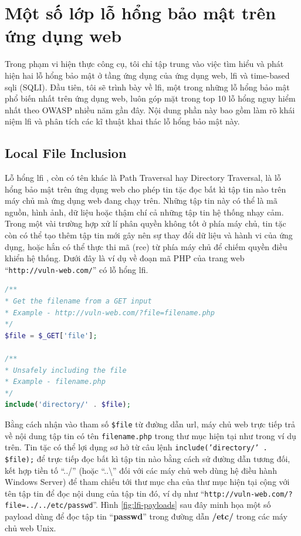 \chapter{Một số lớp lỗ hổng bảo mật trên ứng dụng web}
Trong phạm vi hiện thực công cụ, tôi chỉ tập trung vào việc tìm hiểu và phát hiện hai lỗ hổng bảo mật ở tầng ứng dụng của ứng dụng web, \acrfull{lfi} và time-based \acrlong{sqli} (SQLI). Đầu tiên, tôi sẽ trình bày về \acrfull{lfi}, một trong những lỗ hổng bảo mật phổ biến nhất trên ứng dụng web, luôn góp mặt trong top 10 lỗ hổng nguy hiểm nhất theo OWASP \parencite{owasp-top-10} nhiều năm gần đây. Nội dung phần này bao gồm làm rõ khái niệm \acrshort{lfi} và phân tích các kĩ thuật khai thác lỗ hổng bảo mật này.
\section{Local File Inclusion}
Lỗ hổng \acrfull{lfi} \parencite{portswigger-directory-traversal, owasp-path-traversal, sullivan2011web}, còn có tên khác là Path Traversal hay Directory Traversal, là lỗ hổng bảo mật trên ứng dụng web cho phép tin tặc đọc bất kì tập tin nào trên máy chủ mà ứng dụng web đang chạy trên. Những tập tin này có thể là mã nguồn, hình ảnh, dữ liệu hoặc thậm chí cả những tập tin hệ thống nhạy cảm. Trong một vài trường hợp xử lí phân quyền không tốt ở phía máy chủ, tin tặc còn có thể tạo thêm tập tin mới gây nên sự thay đổi dữ liệu và hành vi của ứng dụng, hoặc hắn có thể thực thi mã (\acrshort{rce}) từ phía máy chủ để chiếm quyền điều khiển hệ thống. Dưới đây là ví dụ về đoạn mã PHP của trang web ``\texttt{http://vuln-web.com/}'' có lỗ hổng \acrshort{lfi}.
\begin{lstlisting}[language=php]
/**
* Get the filename from a GET input
* Example - http://vuln-web.com/?file=filename.php
*/
$file = $_GET['file'];

/**
* Unsafely including the file
* Example - filename.php
*/
include('directory/' . $file);
\end{lstlisting}
Bằng cách nhận vào tham số \texttt{\$file} từ đường dẫn \acrshort{url}, máy chủ web trực tiếp trả về nội dung tập tin có tên \texttt{filename.php} trong thư mục hiện tại như trong ví dụ trên. Tin tặc có thể lợi dụng sơ hở từ câu lệnh \texttt{include('directory/' . \$file);} để trực tiếp đọc bất kì tập tin nào bằng cách sử đường dẫn tương đối, kết hợp tiền tố ``../'' (hoặc ``..\textbackslash'' đối với các máy chủ web dùng hệ điều hành Windows Server) để tham chiếu tới thư mục cha của thư mục hiện tại cộng với tên tập tin để đọc nội dung của tập tin đó, ví dụ như ``\texttt{http://vuln-web.com/?file=../../etc/passwd}''. Hình \ref{fig:lfi-payloads} sau đây minh họa một số payload dùng để đọc tập tin ``\textbf{passwd}'' trong đường dẫn \textbf{/etc/} trong các máy chủ web Unix.
